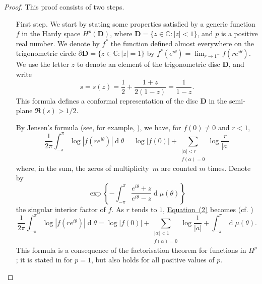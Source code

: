 \documentclass{article}
\newcommand{\dd}{\operatorname{d}\!}
\newcommand{\oldpage}[1]{\marginpar{\footnotesize$\Big\vert$ \textit{p.~#1}}}
\begin{document}
\begin{proof}
  This proof consists of two steps.

  \begin{itemize}
    \item[First step.]
      We start by stating some properties satisfied by a generic function $f$ in the Hardy space $H^p(\mathbf{D})$, where $\mathbf{D}=\{z\in\mathbb{C}:|z|<1\}$, and $p$ is a positive real number.
      We denote by $f^*$ the function defined almost everywhere on the trigonometric circle $\partial\mathbf{D}=\{z\in\mathbb{C}:|z|=1\}$ by $f^*(e^{i\theta})=\lim_{r\to1^-}f(re^{i\theta})$.
      We use the letter $z$ to denote an element of the trigonometric disc $\mathbf{D}$, and write
      \[
        s = s(z) = \frac12+\frac{1+z}{2(1-z)} = \frac{1}{1-z}.
      \]
\oldpage{285}
      This formula defines a conformal representation of the disc $\mathbf{D}$ in the semi-plane $\Re(s)>1/2$.

      By Jensen's formula (see, for example, \cite[Theorem~3.61]{4}), we have, for $f(0)\neq0$ and $r<1$,
      \[
      \label{2}
        \frac{1}{2\pi}\int_{-\pi}^\pi \log|f(re^{i\theta})|\dd\theta
        = \log|f(0)| + \sum_{\substack{|\alpha|<r\\f(\alpha)=0}} \log\frac{r}{|a|}
      \tag{2}
      \]
      where, in the sum, the zeros of multiplicity~$m$ are counted $m$ times.
      Denote by
      \[
        \exp\left\{
          -\int_{-\pi}^\pi \frac{e^{i\theta}+z}{e^{i\theta}-z}\dd\mu(\theta)
        \right\}
      \]
      the singular interior factor of $f$.
      As $r$ tends to $1$, \hyperref[2]{Equation~(2)} becomes (cf. \cite[p.~68]{2})
      \[
      \label{3}
        \frac{1}{2\pi}\int_{-\pi}^\pi \log|f(re^{i\theta})|\dd\theta
        = \log|f(0)| + \sum_{\substack{|\alpha|<1\\f(\alpha)=0}} \log\frac{1}{|a|} + \int_{-\pi}^\pi\dd\mu(\theta).
      \tag{3}
      \]
      This formula is a consequence of the factorisation theorem for functions in $H^p$;
      it is stated in \cite{2} for $p=1$, but also holds for all positive values of $p$.


\end{itemize}
\end{proof}
\end{document}

